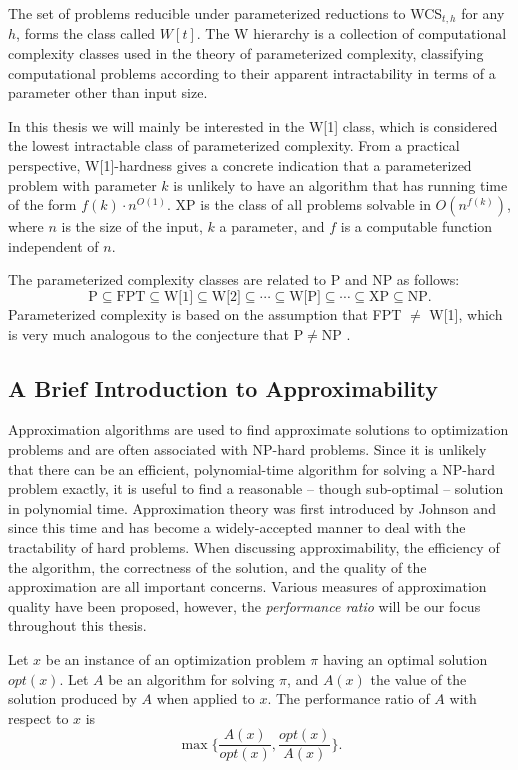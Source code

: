 The set of problems reducible under parameterized reductions to {\sc WCS$_{t, h}$} for any $h$, forms the class called $W[t]$.  The W hierarchy is a collection of computational complexity classes used in the theory of parameterized complexity, classifying computational problems according to their apparent intractability in terms of a parameter other than input size.  

In this thesis we will mainly be interested in the W[1] class, which is considered the lowest intractable class of parameterized complexity.  From a practical perspective, W[1]-hardness gives a concrete indication that a parameterized problem with parameter $k$ is unlikely to have an algorithm that has running time of the form $f(k) \cdot n^{O(1)}$.  XP is the class of all problems solvable in $O(n^{f(k)})$, where $n$ is the size of the input, $k$ a parameter, and $f$ is a computable function independent of $n$. 

The parameterized complexity classes are related to P and NP as follows: $$\mbox{P} \subseteq \mbox{FPT} \subseteq \mbox{W[1]} \subseteq \mbox{W[2]} \subseteq \cdots \subseteq \mbox{W[P]} \subseteq \cdots \subseteq \mbox{XP} \subseteq \mbox{NP.}$$  Parameterized complexity is based on the assumption that FPT $\ne$ W[1], which is very much analogous to the conjecture that P$\ne$NP \cite{DF99}.  


\subsection{A Brief Introduction to Approximability}

Approximation algorithms are used to find approximate solutions to optimization problems and are often associated with NP-hard problems. Since it is unlikely that there can be an efficient, polynomial-time algorithm for solving a NP-hard problem exactly, it is useful to find a reasonable -- though sub-optimal -- solution in polynomial time.  Approximation theory was first introduced  by Johnson \cite{johnson} and since this time and has become a widely-accepted manner to deal with the tractability of hard problems.  When  discussing approximability, the efficiency of the algorithm, the correctness of the solution, and the quality of the approximation are all important concerns. Various measures of approximation quality have been proposed, however, the {\em performance ratio} will be our focus throughout this thesis.

\begin{definition} Let $x$ be an instance of an optimization problem $\pi$ having an optimal solution $opt(x)$. Let $A$ be an algorithm for solving $\pi$, and $A(x)$ the value of the solution produced by $A$ when applied to $x$.  The performance ratio of $A$ with respect to $x$ is $$\max  \{ \frac{A(x)}{opt(x)}, \frac{opt(x)}{A(x)}\}.$$ \end{definition} 

